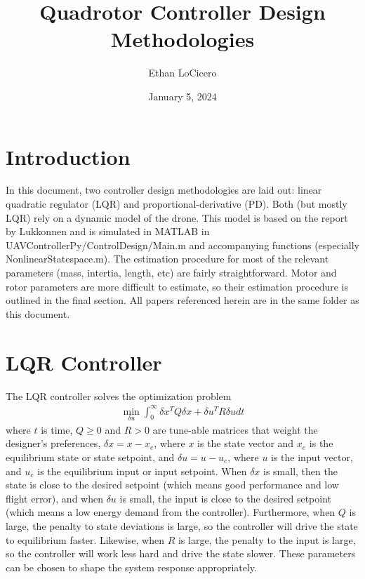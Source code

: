 \documentclass[10pt]{article}
\begin{document}
	
	
	\title{Quadrotor Controller Design Methodologies}
	\author{Ethan LoCicero}
	\date{January 5, 2024}
	\maketitle
	
	\section{Introduction}
	
	In this document, two controller design methodologies are laid out: linear quadratic regulator (LQR) and proportional-derivative (PD). Both (but mostly LQR) rely on a dynamic model of the drone. This model is based on the report by Lukkonnen and is simulated in MATLAB in UAVControllerPy/ControlDesign/Main.m and accompanying functions (especially NonlinearStatespace.m). The estimation procedure for most of the relevant parameters (mass, intertia, length, etc) are fairly straightforward. Motor and rotor parameters are more difficult to estimate, so their estimation procedure is outlined in the final section. All papers referenced herein are in the same folder as this document.
	
	\section{LQR Controller}
	
	The LQR controller solves the optimization problem
	\begin{align}
	 \min_{\delta u}	\int_0^\infty \delta x^T Q \delta x + \delta u^T R \delta u dt \label{eqn:LQR}
	\end{align}
	where $t$ is time, $Q\geq 0$ and $R>0$ are tune-able matrices that weight the designer's preferences, $\delta x = x - x_e$, where $x$ is the state vector and $x_e$ is the equilibrium state or state setpoint, and $\delta u = u - u_e$, where $u$ is the input vector, and $u_e$ is the equilibrium input or input setpoint. When $\delta x$ is small, then the state is close to the desired setpoint (which means good performance and low flight error), and when $\delta u$ is small, the input is close to the desired setpoint (which means a low energy demand from the controller). Furthermore, when $Q$ is large, the penalty to state deviations is large, so the controller will drive the state to equilibrium faster. Likewise, when $R$ is large, the penalty to the input is large, so the controller will work less hard and drive the state slower. These parameters can be chosen to shape the system response appropriately.
	
\end{document}

